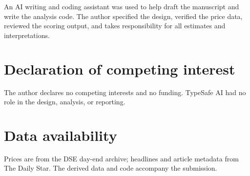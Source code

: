 \documentclass[10pt,twocolumn,a4paper]{article}
\begin{document}
An AI writing and coding assistant was used to help draft the manuscript and write the analysis code.
The author specified the design, verified the price data, reviewed the scoring output, and takes
responsibility for all estimates and interpretations.

\section*{Declaration of competing interest}

The author declares no competing interests and no funding. TypeSafe AI had no role in the design,
analysis, or reporting.

\section*{Data availability}

Prices are from the DSE day-end archive; headlines and article metadata from The Daily Star. The derived
data and code accompany the submission.



\end{document}
